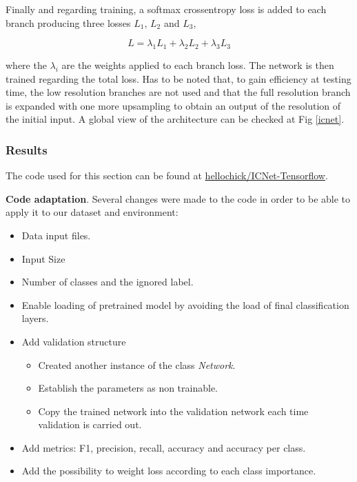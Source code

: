 Finally and regarding training, a softmax crossentropy loss is added to each branch producing three losses $L_{1}$, $L_{2}$ and $L_{3}$,

\begin{equation*}
L = \lambda_{1}L_{1} + \lambda_{2}L_{2} + \lambda_{3}L_{3}
\end{equation*}

where the $\lambda_{i}$ are the weights applied to each branch loss. The network is then trained regarding the total loss. Has to be noted that, to gain efficiency at testing time,  the low resolution branches are not used and that the full resolution branch is expanded with one more upsampling to obtain an output of the resolution of the initial input. A global view of the architecture can be checked at Fig \ref{icnet}.

\subsubsection{Results}

The code used for this section can be found at \href{https://github.com/hellochick/ICNet-tensorflow}{hellochick/ICNet-Tensorflow}.\newline

\textbf{Code adaptation}. Several changes were made to the code in order to be able to apply it to our dataset and environment:

\begin{itemize}
\item Data input files.
\item Input Size
\item Number of classes and the ignored label.
\item Enable loading of pretrained model by avoiding the load of final classification
 layers.
\item Add validation structure
\begin{itemize}
\item Created another instance of the class \textit{Network}. 
\item Establish the parameters as non trainable. 
\item Copy the trained network into the validation network each time validation is carried out. 
\end{itemize}
\item Add metrics:  F1, precision, recall, accuracy and accuracy per class.
\item Add the possibility to weight loss according to each class importance.
\end{itemize}


